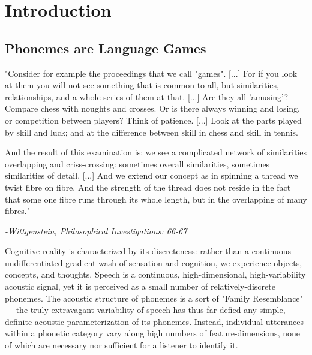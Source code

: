 
% 

\section{Introduction}
\begin{multicols}{2}
\subsection{Phonemes are Language Games}

\begin{leftbar}

"Consider for example the proceedings that we call "games". [...] For if you look at them you will not see something that is common to all, but similarities, relationships, and a whole series of them at that. [...] Are they all 'amusing'? Compare chess with noughts and crosses. Or is there always winning and losing, or competition between players? Think of patience. [...] Look at the parts played by skill and luck; and at the difference between skill in chess and skill in tennis. 

And the result of this examination is: we see a complicated network
of similarities overlapping and criss-crossing: sometimes overall similarities, sometimes similarities of detail. [...] And we extend our concept as in spinning a thread we twist fibre on fibre. And the strength of the thread does not reside in the fact that some one fibre runs through its whole length, but in the overlapping of many fibres."

\textit{-Wittgenstein, Philosophical Investigations: 66-67\cite{wittgensteinPhilosophicalInvestigations1968}}

\end{leftbar}

Cognitive reality is characterized by its discreteness: rather than a continuous undifferentiated gradient wash of sensation and cognition, we experience objects, concepts, and thoughts. Speech is a continuous, high-dimensional, high-variability acoustic signal, yet it is perceived as a small number of relatively-discrete phonemes\cite{holtSpeechPerceptionCategorization2010}. The acoustic structure of phonemes is a sort of "Family Resemblance"\cite{wittgensteinPhilosophicalInvestigations1968} --- the truly extravagant variability of speech has thus far defied any simple, definite acoustic parameterization of its phonemes. Instead, individual utterances within a phonetic category vary along high numbers of feature-dimensions, none of which are necessary nor sufficient for a listener to identify it. 


\end{multicols}
